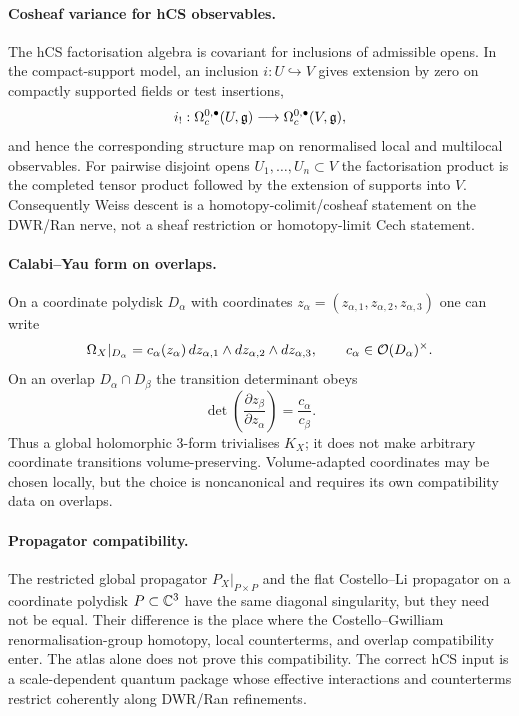 \paragraph{Cosheaf variance for hCS observables.}
\ClaimStatusVerified{}
The hCS factorisation algebra is covariant for inclusions of
admissible opens. In the compact-support model, an inclusion
$i:U\hookrightarrow V$ gives extension by zero on compactly supported
fields or test insertions,
\[
 i_!:\Omega_c^{0,\bullet}(U,\mathfrak{g})\longrightarrow
 \Omega_c^{0,\bullet}(V,\mathfrak{g}),
\]
and hence the corresponding structure map on renormalised local and
multilocal observables. For pairwise disjoint opens
$U_1,\ldots,U_n\subset V$ the factorisation product is the completed
tensor product followed by the extension of supports into $V$.
Consequently Weiss descent is a homotopy-colimit/cosheaf statement on
the DWR/Ran nerve, not a sheaf restriction or homotopy-limit Cech
statement.

\paragraph{Calabi--Yau form on overlaps.}
\ClaimStatusVerified{}
On a coordinate polydisk $D_\alpha$ with coordinates
$z_\alpha=(z_{\alpha,1},z_{\alpha,2},z_{\alpha,3})$ one can write
\[
 \Omega_X|_{D_\alpha}
 = c_\alpha(z_\alpha)\,
 dz_{\alpha,1}\wedge dz_{\alpha,2}\wedge dz_{\alpha,3},
 \qquad c_\alpha\in\mathcal{O}(D_\alpha)^\times.
\]
On an overlap $D_\alpha\cap D_\beta$ the transition determinant obeys
\[
 \det\!\left(\frac{\partial z_\beta}{\partial z_\alpha}\right)
 = \frac{c_\alpha}{c_\beta}.
\]
Thus a global holomorphic $3$-form trivialises $K_X$; it does not make
arbitrary coordinate transitions volume-preserving. Volume-adapted
coordinates may be chosen locally, but the choice is noncanonical and
requires its own compatibility data on overlaps.

\paragraph{Propagator compatibility.}
\ClaimStatusOpen{}
The restricted global propagator
$P_X|_{P\times P}$ and the flat Costello--Li propagator on a coordinate
polydisk $P\subset\mathbb{C}^3$ have the same diagonal singularity, but they
need not be equal. Their difference is the place where the
Costello--Gwilliam renormalisation-group homotopy, local counterterms,
and overlap compatibility enter. The atlas alone does not prove this
compatibility. The correct hCS input is a scale-dependent quantum
package whose effective interactions and counterterms restrict
coherently along DWR/Ran refinements.

